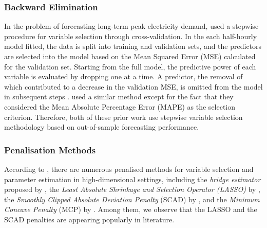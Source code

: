 \documentclass[11pt,a4paper,]{article}
\begin{document}
\hypertarget{backward-elimination}{%
\subsubsection{Backward Elimination}\label{backward-elimination}}

In the problem of forecasting long-term peak electricity demand,
\textcite{HF2010} used a stepwise procedure for variable selection
through cross-validation. In the each half-hourly model fitted, the data
is split into training and validation sets, and the predictors are
selected into the model based on the Mean Squared Error (MSE) calculated
for the validation set. Starting from the full model, the predictive
power of each variable is evaluated by dropping one at a time. A
predictor, the removal of which contributed to a decrease in the
validation MSE, is omitted from the model in subsequent steps
\autocite{HF2010}. \textcite{FH2012} used a similar method except for
the fact that they considered the Mean Absolute Percentage Error (MAPE)
as the selection criterion. Therefore, both of these prior work use
stepwise variable selection methodology based on out-of-sample
forecasting performance.

\hypertarget{penalisation-methods}{%
\subsubsection{Penalisation Methods}\label{penalisation-methods}}

According to \textcite{Huang2010}, there are numerous penalised methods
for variable selection and parameter estimation in high-dimensional
settings, including the \emph{bridge estimator} proposed by
\textcite{Frank1993}, the \emph{Least Absolute Shrinkage and Selection
Operator (LASSO)} by \textcite{Tibshirani1996}, the \emph{Smoothly
Clipped Absolute Deviation Penalty} (SCAD) by \textcite{Fan2001}, and
the \emph{Minimum Concave Penalty} (MCP) by \textcite{Zhang2010}. Among
them, we observe that the LASSO and the SCAD penalties are appearing
popularly in literature.
\end{document}

